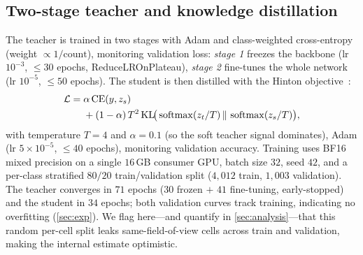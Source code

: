 \subsection{Two-stage teacher and knowledge distillation}
\label{sec:train}
The teacher is trained in two stages with Adam and class-weighted cross-entropy (weight
$\propto 1/\text{count}$), monitoring validation loss: \emph{stage 1} freezes the backbone (lr
$10^{-3}$, $\le 30$ epochs, ReduceLROnPlateau), \emph{stage 2} fine-tunes the whole network (lr
$10^{-5}$, $\le 50$ epochs). The student is then distilled with the Hinton
objective~\cite{hinton2015distilling}:
\begin{equation}
\begin{split}
\mathcal{L} = {}&\alpha\,\mathrm{CE}(y,z_s) \\
&+ (1-\alpha)\,T^2\,
\mathrm{KL}\!\big(\operatorname{softmax}(z_t/T)\,\|\,\operatorname{softmax}(z_s/T)\big),
\end{split}
\label{eq:kd}
\end{equation}
with temperature $T{=}4$ and $\alpha{=}0.1$ (so the soft teacher signal dominates), Adam (lr
$5\!\times\!10^{-5}$, $\le 40$ epochs), monitoring validation accuracy. Training uses BF16 mixed
precision on a single $16$\,GB consumer GPU, batch size $32$, seed $42$, and a per-class stratified
$80/20$ train/validation split ($4{,}012$ train, $1{,}003$ validation). The teacher converges in
$71$ epochs ($30$ frozen $+$ $41$ fine-tuning, early-stopped) and the student in $34$ epochs; both
validation curves track training, indicating no overfitting (\cref{sec:exp}). We flag here---and
quantify in \cref{sec:analysis}---that this random per-cell split leaks same-field-of-view cells
across train and validation, making the internal estimate optimistic.
